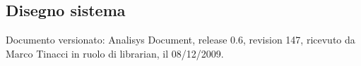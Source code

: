 \subsection{Disegno sistema}
Documento versionato: Analisys Document, release 0.6, revision 147, ricevuto da
Marco Tinacci in ruolo di librarian, il 08/12/2009.